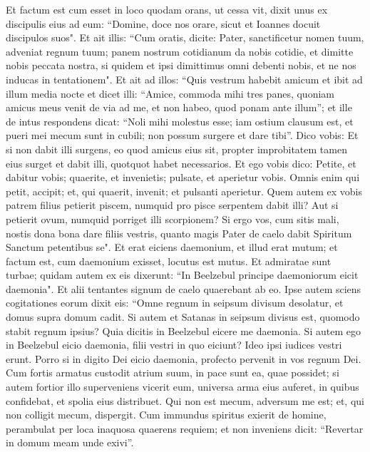 \begin{biblechapter}  
\verse Et factum est cum esset in loco quodam orans, ut cessa vit, dixit unus ex discipulis eius ad eum: “Domine, doce nos orare, sicut et Ioannes docuit discipulos suos". 
\verse Et ait illis: “Cum oratis, dicite: Pater, sanctificetur nomen tuum, adveniat regnum tuum; 
\verse panem nostrum cotidianum da nobis cotidie, 
\verse et dimitte nobis peccata nostra, si quidem et ipsi dimittimus omni debenti nobis, et ne nos inducas in tentationem". 
\verse Et ait ad illos: “Quis vestrum habebit amicum et ibit ad illum media nocte et dicet illi: “Amice, commoda mihi tres panes, 
\verse quoniam amicus meus venit de via ad me, et non habeo, quod ponam ante illum”; 
\verse et ille de intus respondens dicat: “Noli mihi molestus esse; iam ostium clausum est, et pueri mei mecum sunt in cubili; non possum surgere et dare tibi”. 
\verse Dico vobis: Et si non dabit illi surgens, eo quod amicus eius sit, propter improbitatem tamen eius surget et dabit illi, quotquot habet necessarios. 
\verse Et ego vobis dico: Petite, et dabitur vobis; quaerite, et invenietis; pulsate, et aperietur vobis. 
\verse Omnis enim qui petit, accipit; et, qui quaerit, invenit; et pulsanti aperietur. 
\verse Quem autem ex vobis patrem filius petierit piscem, numquid pro pisce serpentem dabit illi? 
\verse Aut si petierit ovum, numquid porriget illi scorpionem? 
\verse Si ergo vos, cum sitis mali, nostis dona bona dare filiis vestris, quanto magis Pater de caelo dabit Spiritum Sanctum petentibus se". 
\verse Et erat eiciens daemonium, et illud erat mutum; et factum est, cum daemonium exisset, locutus est mutus. Et admiratae sunt turbae; 
\verse quidam autem ex eis dixerunt: “In Beelzebul principe daemoniorum eicit daemonia". 
\verse Et alii tentantes signum de caelo quaerebant ab eo. 
\verse Ipse autem sciens cogitationes eorum dixit eis: “Omne regnum in seipsum divisum desolatur, et domus supra domum cadit. 
\verse Si autem et Satanas in seipsum divisus est, quomodo stabit regnum ipsius? Quia dicitis in Beelzebul eicere me daemonia.  
\verse Si autem ego in Beelzebul eicio daemonia, filii vestri in quo eiciunt? Ideo ipsi iudices vestri erunt. 
\verse Porro si in digito Dei eicio daemonia, profecto pervenit in vos regnum Dei. 
\verse Cum fortis armatus custodit atrium suum, in pace sunt ea, quae possidet;  
\verse si autem fortior illo superveniens vicerit eum, universa arma eius auferet, in quibus confidebat, et spolia eius distribuet. 
\verse Qui non est mecum, adversum me est; et, qui non colligit mecum, dispergit. 
\verse Cum immundus spiritus exierit de homine, perambulat per loca inaquosa quaerens requiem; et non inveniens dicit: “Revertar in domum meam unde exivi”. 

\end{biblechapter}
